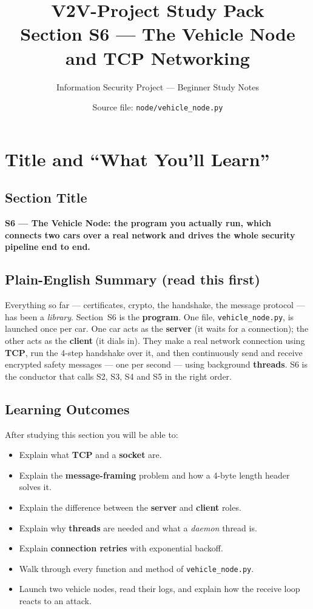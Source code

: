 \documentclass[11pt,a4paper]{article}
\title{\textbf{V2V-Project Study Pack}\\[4pt]
       \large Section S6 --- The Vehicle Node and TCP Networking}
\author{Information Security Project --- Beginner Study Notes}
\date{Source file: \texttt{node/vehicle\_node.py}}
\begin{document}
\maketitle
\tableofcontents
\newpage

\section{Title and ``What You'll Learn''}

\subsection*{Section Title}
\textbf{S6 --- The Vehicle Node: the program you actually run, which connects two
cars over a real network and drives the whole security pipeline end to end.}

\subsection*{Plain-English Summary (read this first)}
Everything so far --- certificates, crypto, the handshake, the message protocol
--- has been a \emph{library}. Section~S6 is the \textbf{program}. One file,
\texttt{vehicle\_node.py}, is launched once per car. One car acts as the
\textbf{server} (it waits for a connection); the other acts as the
\textbf{client} (it dials in). They make a real network connection using
\textbf{TCP}, run the 4-step handshake over it, and then continuously send and
receive encrypted safety messages --- one per second --- using background
\textbf{threads}. S6 is the conductor that calls S2, S3, S4 and S5 in the right
order.

\subsection*{Learning Outcomes}
After studying this section you will be able to:
\begin{itemize}
  \item Explain what \textbf{TCP} and a \textbf{socket} are.
  \item Explain the \textbf{message-framing} problem and how a 4-byte length
        header solves it.
  \item Explain the difference between the \textbf{server} and \textbf{client}
        roles.
  \item Explain why \textbf{threads} are needed and what a \emph{daemon} thread is.
  \item Explain \textbf{connection retries} with exponential backoff.
  \item Walk through every function and method of \texttt{vehicle\_node.py}.
  \item Launch two vehicle nodes, read their logs, and explain how the receive
        loop reacts to an attack.
\end{itemize}
\end{document}
